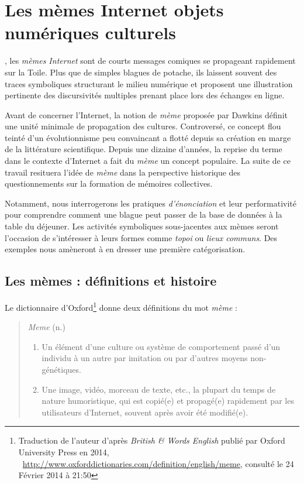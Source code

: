 \chapter[Les mèmes Internet, objets numériques culturels]{Les mèmes Internet
 objets numériques culturels}
\label{chap:memes}

, les \textit{mèmes Internet} sont de courts messages comiques se propageant rapidement sur la Toile. Plus que de simples blagues de potache, ils laissent souvent des traces symboliques structurant le milieu numérique et proposent une illustration pertinente des discursivités multiples prenant place lors des échanges en ligne. 

Avant de concerner l'Internet, la notion de \textit{mème} proposée par Dawkins définit une unité minimale de propagation des cultures. Controversé, ce concept flou teinté d{\textquoteright}un évolutionnisme peu convaincant a flotté depuis sa création en marge de la littérature scientifique. Depuis une dizaine d'années, la reprise du terme dans le contexte d'Internet a fait du \textit{mème} un concept populaire. La suite de ce travail resituera l'idée de \textit{mème} dans la perspective historique des questionnements sur la formation de mémoires collectives.

Notamment, nous interrogerons les pratiques \textit{d{\textquoteright}énonciation} et leur performativité pour comprendre comment une blague peut passer de la base de données à la table du déjeuner. Les activités symboliques sous-jacentes aux mèmes seront l'occasion de s'intéresser à leurs formes comme \textit{topoi} ou \textit{lieux communs}. Des exemples nous amèneront à en dresser une première catégorisation.

\section[Les mèmes : définitions et histoire ]{Les mèmes : définitions et histoire } 

Le dictionnaire d{\textquoteright}Oxford\footnote{Traduction de l'auteur d{\textquoteright}après \textit{British \& Words English} publié par Oxford University Press en 2014, \ \url{http://www.oxforddictionaries.com/definition/english/meme}, consulté le 24 Février 2014 à 21:50} donne deux définitions du mot \textit{mème }: 

\begin{quote}
    \textit{Meme} (n.)

    \begin{enumerate}
        \item Un élément d{\textquoteright}une culture ou système de comportement passé d{\textquoteright}un individu à un autre par imitation ou par d{\textquoteright}autres moyens non-génétiques.
        \item Une image, vidéo, morceau de texte, etc., la plupart du temps de nature humoristique, qui est copié(e) et propagé(e) rapidement par les utilisateurs d{\textquoteright}Internet, souvent après avoir été modifié(e).
    \end{enumerate}

\end{quote}

